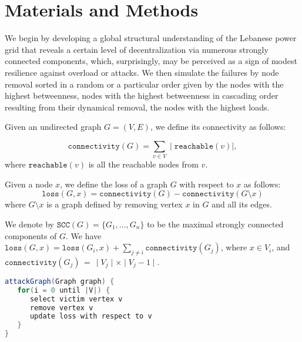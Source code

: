 \section{Materials and Methods}
\label{methods}
We begin by developing a global structural understanding of the Lebanese power grid that reveals a certain level of decentralization via numerous strongly connected components, which, surprisingly, may be perceived as a sign of modest resilience against overload or attacks. 
We then simulate the failures by node removal sorted in a random or a particular order given by the nodes with the highest betweenness, nodes with the highest betweenness in cascading order resulting from their dynamical removal, the nodes with the highest loads. 

Given an undirected graph $G=(V,E)$, we define its connectivity as follows:

$$
\mathtt{connectivity}(G) = \sum_{v \in V} \mid \mathtt{reachable}(v) \mid,
$$ where $\mathtt{reachable}(v)$ is all the reachable nodes from $v$.

Given a node $x$, we define the loss of a graph $G$ with respect to $x$ as follows:
$$
\mathtt{loss}(G, x) = \mathtt{connectivity}(G) - \mathtt{connectivity}(G \setminus x)
$$
where $G \setminus x$ is a graph defined by removing vertex $x$ in $G$ and all its edges. 

We denote by $\mathtt{SCC}(G) = \{G_1, \ldots, G_n\}$ to be the maximal strongly connected components of $G$. 
We have $\mathtt{loss}(G, x) = \mathtt{loss}(G_i,x) + \sum_{j \neq i} \mathtt{connectivity}(G_j)$, where $x \in V_i$, and  $\mathtt{connectivity}(G_j) \,=\, \mid V_j \mid \times \mid V_j  - 1\mid$.

\begin{lstlisting}[language=java]
attackGraph(Graph graph) {
   for(i = 0 until |V|) {
      select victim vertex v
      remove vertex v
      update loss with respect to v
   }
}
\end{lstlisting}

